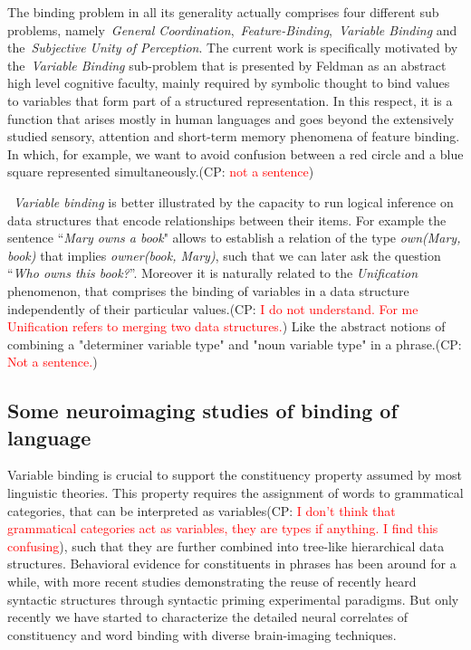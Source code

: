 \documentclass[10pt]{article}
\newcommand{\noteCP}[1]{(CP: \textcolor{red}{#1})}
\begin{document}
The binding problem in all its generality actually comprises four different sub problems, namely~\emph{General Coordination},~\emph{Feature-Binding},~\emph{Variable Binding} and the~\emph{Subjective Unity of Perception}\cite{Feldman_2012}.
The current work is specifically motivated by the~\emph{Variable Binding} sub-problem that is presented by Feldman as an abstract high level cognitive faculty, mainly required by symbolic thought to bind values to variables that form part of a structured representation.
In this respect, it is a function that arises mostly in human languages and goes beyond the extensively studied sensory, attention and short-term memory phenomena of feature binding.
In which, for example, we want to avoid confusion between a red circle and a blue square represented simultaneously.\noteCP{not a sentence}

~\emph{Variable binding} is better illustrated by the capacity to run logical inference on data structures that encode relationships between their items.
For example the sentence ``\emph{Mary owns a book}" allows to establish a relation of the type \emph{own(Mary, book)} that implies \emph{owner(book, Mary)}, such that we can later ask the question ``\emph{Who owns this book?}''.
Moreover it is naturally related to the \emph{Unification} phenomenon, that comprises the binding of variables in a data structure independently of their particular values.\noteCP{I do not understand. For me Unification refers to merging two data structures.}
Like the abstract notions of combining a "determiner variable type" and "noun variable type" in a phrase.\noteCP{Not a sentence.}

\subsection{Some neuroimaging studies of binding of language}

{\label{729344}}

Variable binding is crucial to support the constituency property assumed by most linguistic theories.
This property requires the assignment of words to grammatical categories, that can be interpreted as variables\noteCP{I don't think that grammatical categories act as variables, they are types if anything. I find this confusing}, such that they are further combined into tree-like hierarchical data structures.
Behavioral evidence for constituents in phrases has been around for a while\cite{bever1969underlying, abrams1969syntactic}, with more recent studies demonstrating the reuse of recently heard syntactic structures through syntactic priming experimental paradigms\cite{bock2007persistent, branigan2000syntactic}.
But only recently we have started to characterize the detailed neural correlates of constituency and word binding with diverse brain-imaging techniques\cite{Nelson_2017, fedorenko2016neural, brennan2016abstract, ding2016cortical, bemis2012basic, Pallier_2011, bastiaansen2010syntactic, longe2006grammatical}.
\end{document}
